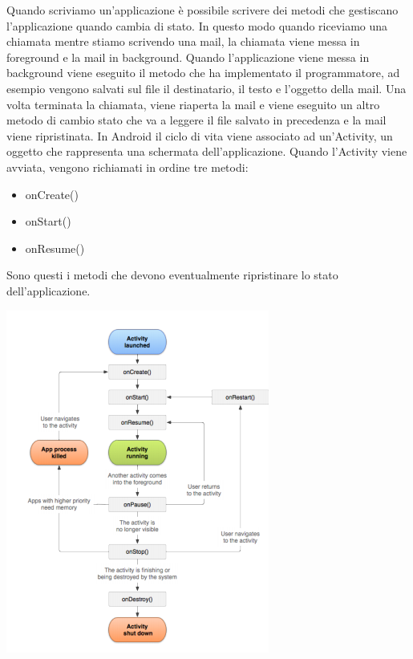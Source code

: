 Quando scriviamo un'applicazione è possibile scrivere dei metodi che gestiscano l'applicazione quando cambia di stato. In questo modo quando riceviamo una chiamata mentre stiamo scrivendo una mail, la chiamata viene messa in foreground e la mail in background. Quando l'applicazione viene messa in background viene eseguito il metodo che ha implementato il programmatore, ad esempio vengono salvati sul file il destinatario, il testo e l'oggetto della mail. Una volta terminata la chiamata, viene riaperta la mail e viene eseguito un altro metodo di cambio stato che va a leggere il file salvato in precedenza e la mail viene ripristinata.
\newpage
In Android il ciclo di vita viene associato ad un'Activity, un oggetto che rappresenta una schermata dell'applicazione.
Quando l'Activity viene avviata, vengono richiamati in ordine tre metodi: 
\begin{itemize}
    \item onCreate()
    \item onStart()
    \item onResume()
\end{itemize}
Sono questi i metodi che devono eventualmente ripristinare lo stato dell'applicazione. 
\begin{center}
    \includegraphics[width=.6\textwidth]{images/Mobile computing/2. Sistemi operativi/ciclo di vita Android.PNG}
\end{center}

